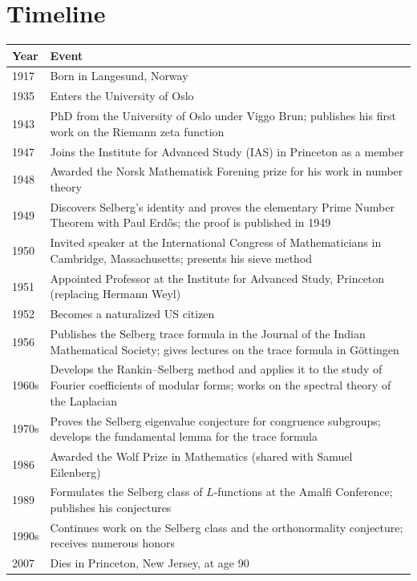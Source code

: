 \section*{Timeline}
\begin{tabularx}{\linewidth}{|p{1.5cm}|>{\raggedright\arraybackslash}X|}
\hline
\textbf{Year} & \textbf{Event} \\ \hline
1917 & Born in Langesund, Norway \\ \hline
1935 & Enters the University of Oslo \\ \hline
1943 & PhD from the University of Oslo under Viggo Brun; publishes his first work on the Riemann zeta function \\ \hline
1947 & Joins the Institute for Advanced Study (IAS) in Princeton as a member \\ \hline
1948 & Awarded the Norsk Mathematisk Forening prize for his work in number theory \\ \hline
1949 & Discovers Selberg's identity and proves the elementary Prime Number Theorem with Paul Erd\H{o}s; the proof is published in 1949 \\ \hline
1950 & Invited speaker at the International Congress of Mathematicians in Cambridge, Massachusetts; presents his sieve method \\ \hline
1951 & Appointed Professor at the Institute for Advanced Study, Princeton (replacing Hermann Weyl) \\ \hline
1952 & Becomes a naturalized US citizen \\ \hline
1956 & Publishes the Selberg trace formula in the Journal of the Indian Mathematical Society; gives lectures on the trace formula in G\"ottingen \\ \hline
1960s & Develops the Rankin--Selberg method and applies it to the study of Fourier coefficients of modular forms; works on the spectral theory of the Laplacian \\ \hline
1970s & Proves the Selberg eigenvalue conjecture for congruence subgroups; develops the fundamental lemma for the trace formula \\ \hline
1986 & Awarded the Wolf Prize in Mathematics (shared with Samuel Eilenberg) \\ \hline
1989 & Formulates the Selberg class of \(L\)-functions at the Amalfi Conference; publishes his conjectures \\ \hline
1990s & Continues work on the Selberg class and the orthonormality conjecture; receives numerous honors \\ \hline
2007 & Dies in Princeton, New Jersey, at age 90 \\ \hline
\end{tabularx}


